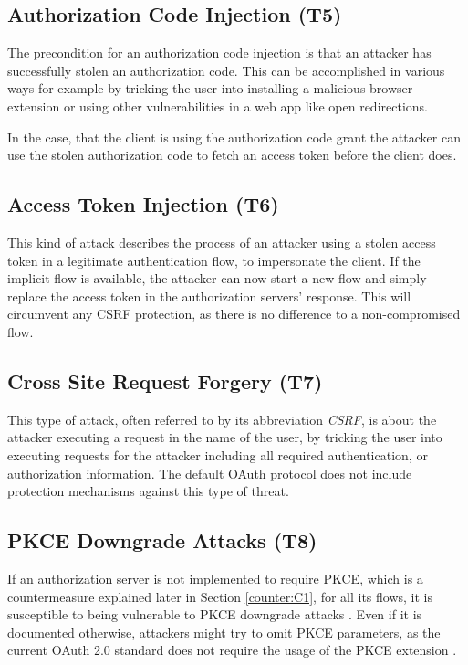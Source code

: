 \subsection[Authorization Code Injection]{Authorization Code Injection (T5)}
\label{threat:T5} 
The precondition for an authorization code injection is that an attacker has
successfully stolen an authorization code. This can be accomplished in various
ways for example by tricking the user into installing a malicious browser
extension or using other vulnerabilities in a web app like open redirections\cite{philippaerts2022oauch}.

In the case, that the client is using the authorization code grant the attacker can use the stolen authorization code to fetch an access token before the client does.

\subsection[Access Token Injection]{Access Token Injection (T6)}
\label{threat:T6}
This kind of attack describes the process of an attacker using a stolen access token in a legitimate authentication flow, to impersonate the client. If the implicit flow is available, the attacker can now start a new flow and simply replace the access token in the authorization servers' response. This will circumvent any CSRF protection, as there is no difference to a non-compromised
flow. \cite{lodderstedt2020oauth}


\subsection[Cross Site Request Forgery]{Cross Site Request Forgery (T7)}
\label{threat:T7}
This type of attack, often referred to by its abbreviation \emph{CSRF}, is about
the attacker executing a request in the name of the user, by tricking the user
into executing requests for the attacker including all required authentication,
or authorization information. The default OAuth protocol does not include
protection mechanisms against this type of threat. 

\subsection[PKCE Downgrade Attacks]{PKCE Downgrade Attacks (T8)}
\label{threat:T8}
If an authorization server is not implemented to require PKCE, which is a countermeasure explained later in Section \ref{counter:C1}, for all its
flows, it is susceptible to being vulnerable to PKCE downgrade attacks
\cite{philippaerts2022oauch}. Even if it is documented otherwise, attackers
might try to omit PKCE parameters, as the current OAuth 2.0 standard does not
require the usage of the PKCE extension \cite{hardt2012rfc}. 


